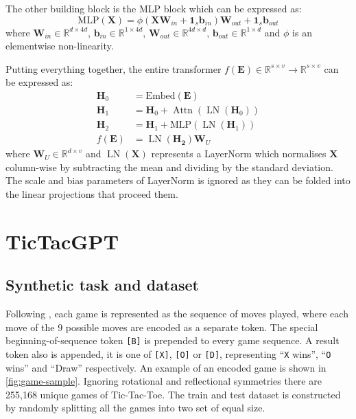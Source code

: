 \documentclass{article}
\newcommand{\ttgpt}{TicTacGPT\xspace}
\newcommand{\ttt}{Tic-Tac-Toe\xspace}
\renewcommand{\v}[1]{\mathbf{\bm{#1}}}
\newcommand{\m}[1]{\mathbf{\bm{#1}}}
\newcommand{\R}{\mathbb{R}}
\DeclareMathOperator{\layernorm}{LN}
\DeclareMathOperator{\attn}{Attn}
\begin{document}
The other building block is the MLP block which can be expressed as:
\begin{equation*}
    \text{MLP}(\m{X}) = \phi(
    \m{X} \m{W}_{in} + \v{1}_s \m{b}_{in}
    ) \m{W}_{out} + \v{1}_s \m{b}_{out}
\end{equation*}
where $\m{W}_{in} \in \R^{d \times 4d}$, $\v{b}_{in} \in \R^{1 \times 4d}$, $\m{W}_{out} \in \R^{4d \times d}$, $\v{b}_{out} \in \R^{1 \times d}$ and $\phi$ is an elementwise non-linearity.

Putting everything together, the entire transformer $f(\m{E}) \in \R^{s \times v} \to \R^{s \times v}$ can be expressed as:
\begin{equation*}
    \begin{aligned}
        \m{H}_0  & = \text{Embed}(\m{E})                       \\
        \m{H}_1  & = \m{H}_0 + \attn(\layernorm(\m{H}_0))      \\
        \m{H}_2  & = \m{H}_1 + \text{MLP}(\layernorm(\m{H}_1)) \\
        f(\m{E}) & = \layernorm(\m{H_2}) \m{W}_U
    \end{aligned}
\end{equation*}
where $\m{W}_U \in \R^{d \times v}$ and $\layernorm(\m{X})$ represents a LayerNorm which normalises $\m{X}$ column-wise by subtracting the mean and dividing by the standard deviation. The scale and bias parameters of LayerNorm is ignored as they can be folded into the linear projections that proceed them.

\section{\ttgpt}

\subsection{Synthetic task and dataset}



Following \cite{orthello-gpt}, each game is represented as the sequence of moves played, where each move of the 9 possible moves are encoded as a separate token. The special beginning-of-sequence token \texttt{[B]} is prepended to every game sequence. A result token also is appended, it is one of \texttt{[X]}, \texttt{[O]} or \texttt{[D]}, representing ``\texttt{X} wins'', ``\texttt{O} wins'' and ``Draw'' respectively. An example of an encoded game is shown in \cref{fig:game-sample}. Ignoring rotational and reflectional symmetries there are 255,168 unique games of \ttt. The train and test dataset is constructed by randomly splitting all the games into two set of equal size.
\end{document}
